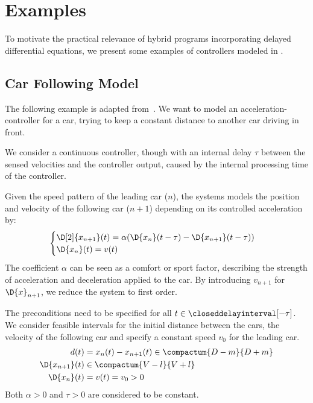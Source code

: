 \chapter{Examples}
\label{ch:example-hp}

To motivate the practical relevance of hybrid programs incorporating delayed differential equations, we present some examples of controllers modeled in \ddL.

\section{Car Following Model}

    The following example is adapted from~\cite{Erneux09AppliedDDEs}.
    We want to model an acceleration-controller for a car, trying to keep a constant distance to another car driving in front.

    We consider a continuous controller, though with an internal delay $\tau$ between the sensed velocities and the controller output, caused by the internal processing time of the controller.

    Given the speed pattern of the leading car ($n$), the systems models the position and velocity of the following car ($n+1$) depending on its controlled acceleration by:
    \begin{equation*}
        \begin{cases}
            \D[2]{x_{n+1}}(t) = \alpha (\D{x_n}(t-\tau)-\D{x_{n+1}}(t-\tau))\\
            \D{x_n}(t) = v(t)
        \end{cases}
    \end{equation*}
    The coefficient $\alpha$ can be seen as a comfort or sport factor, describing the strength of acceleration and deceleration applied to the car.
    By introducing $v_{n+1}$ for $\D{x}_{n+1}$, we reduce the system to first order.

    The preconditions need to be specified for all $t\in\closeddelayinterval[-\tau]$. We consider feasible intervals for the initial distance between the cars, the velocity of the following car and specify a constant speed $v_0$ for the leading car.
    \begin{align*}
        d(t) &= x_n(t)-x_{n+1}(t) \in\compactum{D-m}{D+m}\\
        \D{x_{n+1}}(t) &\in\compactum{V-l}{V+l}\\
        \D{x_n}(t) &= v(t) = v_0 >0
    \end{align*}
    Both $\alpha>0$ and $\tau>0$ are considered to be constant.

